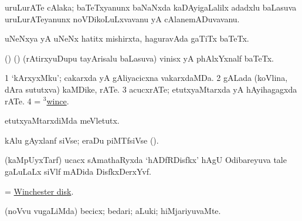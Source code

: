 \bentry
{}
\gl{\nA}
\bmng
uruLurATe cAlaka; baTeTxyanunx baNaNxda kaDAyigaLalilx adadxlu baLasuva uruLurATeyanunx noVDikoLuLxvavanu yA cAlanemADuvavanu. 
\emng
\eentry

\bentry
{}
\gl{\nA} 
\bmng
uNeNxya yA uNeNx hatitx mishirxta, haguravAda gaTiTx baTeTx. 
\emng
\eentry

\bentry
{}
\gl{\nA}
\bmng
(\birx) (\kanmu) (rAtirxyuDupu tayArisalu baLasuva) vinisx yA phAlxYxnalf baTeTx. 
\emng
\eentry

\bentry
{} 
\gl{\nA}
\expl{}
\bmng
\bnum
\num{1} `kArxyxMku'; cakarxda yA gAliyacicxna vakarxdaMDa. 
\num{2} gALada (koVlina, dAra sututxva) kaMDike, rATe. 
\num{3} acucxrATe; etutxyaMtarxda yA hAyihagagxda rATe. 
\num{4} = \hyperlink{wince(3)}{$^3$wince}. 
\enum
\emng
\eentry

\bentry
{} 
\gl{\sakirx}
\bmng
etutxyaMtarxdiMda meVletutx. 
\emng
\eentry

\bentry
{} 
\gl{\nA}
\expl{}
\bmng
kAlu gAyxlanf siVse; eraDu piMTfsiVse (). 
\emng
\eentry

\bentry
{} 
\gl{\nA}
\bmng
(kaMpUyxTarf) ucacx sAmathaRyxda `hADfRDisfkx' hAgU Odibareyuva tale gaLuLaLx siVlf mADida DisfkxDerxYvf. 
\emng
\eentry

\bentry
{}
\gl{\nA}
\bmng
= \hyperlink{Winchester disk}{Winchester disk}. 
\emng
\eentry

\bentry
{}
\gl{\kirxvi}
\bmng
(noVvu \mo vugaLiMda) becicx; bedari; aLuki; hiMjariyuvaMte. 
\emng
\eentry


